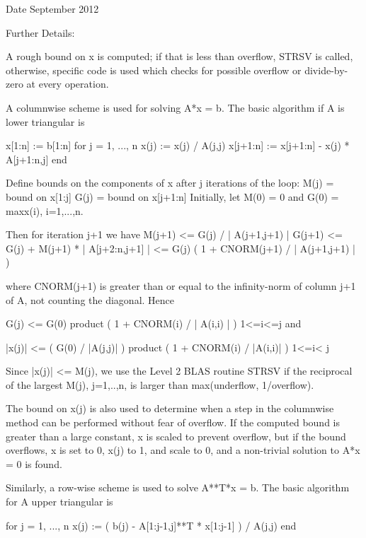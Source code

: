 \begin{DoxyDate}{Date}
September 2012 
\end{DoxyDate}
\begin{DoxyParagraph}{Further Details\+: }
\begin{DoxyVerb}  A rough bound on x is computed; if that is less than overflow, STRSV
  is called, otherwise, specific code is used which checks for possible
  overflow or divide-by-zero at every operation.

  A columnwise scheme is used for solving A*x = b.  The basic algorithm
  if A is lower triangular is

       x[1:n] := b[1:n]
       for j = 1, ..., n
            x(j) := x(j) / A(j,j)
            x[j+1:n] := x[j+1:n] - x(j) * A[j+1:n,j]
       end

  Define bounds on the components of x after j iterations of the loop:
     M(j) = bound on x[1:j]
     G(j) = bound on x[j+1:n]
  Initially, let M(0) = 0 and G(0) = max{x(i), i=1,...,n}.

  Then for iteration j+1 we have
     M(j+1) <= G(j) / | A(j+1,j+1) |
     G(j+1) <= G(j) + M(j+1) * | A[j+2:n,j+1] |
            <= G(j) ( 1 + CNORM(j+1) / | A(j+1,j+1) | )

  where CNORM(j+1) is greater than or equal to the infinity-norm of
  column j+1 of A, not counting the diagonal.  Hence

     G(j) <= G(0) product ( 1 + CNORM(i) / | A(i,i) | )
                  1<=i<=j
  and

     |x(j)| <= ( G(0) / |A(j,j)| ) product ( 1 + CNORM(i) / |A(i,i)| )
                                   1<=i< j

  Since |x(j)| <= M(j), we use the Level 2 BLAS routine STRSV if the
  reciprocal of the largest M(j), j=1,..,n, is larger than
  max(underflow, 1/overflow).

  The bound on x(j) is also used to determine when a step in the
  columnwise method can be performed without fear of overflow.  If
  the computed bound is greater than a large constant, x is scaled to
  prevent overflow, but if the bound overflows, x is set to 0, x(j) to
  1, and scale to 0, and a non-trivial solution to A*x = 0 is found.

  Similarly, a row-wise scheme is used to solve A**T*x = b.  The basic
  algorithm for A upper triangular is

       for j = 1, ..., n
            x(j) := ( b(j) - A[1:j-1,j]**T * x[1:j-1] ) / A(j,j)
       end


\end{DoxyVerb}
\end{DoxyParagraph}
